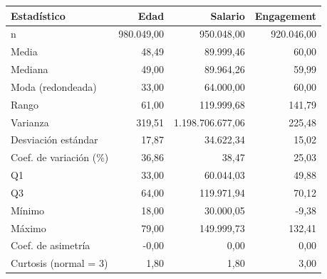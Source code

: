 \begin{tabular}{lrrr}
\toprule
Estadístico & Edad & Salario & Engagement \\
\midrule
n & 980.049,00 & 950.048,00 & 920.046,00 \\
Media & 48,49 & 89.999,46 & 60,00 \\
Mediana & 49,00 & 89.964,26 & 59,99 \\
Moda (redondeada) & 33,00 & 64.000,00 & 60,00 \\
Rango & 61,00 & 119.999,68 & 141,79 \\
Varianza & 319,51 & 1.198.706.677,06 & 225,48 \\
Desviación estándar & 17,87 & 34.622,34 & 15,02 \\
Coef. de variación (\%) & 36,86 & 38,47 & 25,03 \\
Q1 & 33,00 & 60.044,03 & 49,88 \\
Q3 & 64,00 & 119.971,94 & 70,12 \\
Mínimo & 18,00 & 30.000,05 & -9,38 \\
Máximo & 79,00 & 149.999,73 & 132,41 \\
Coef. de asimetría & -0,00 & 0,00 & 0,00 \\
Curtosis (normal = 3) & 1,80 & 1,80 & 3,00 \\
\bottomrule
\end{tabular}

